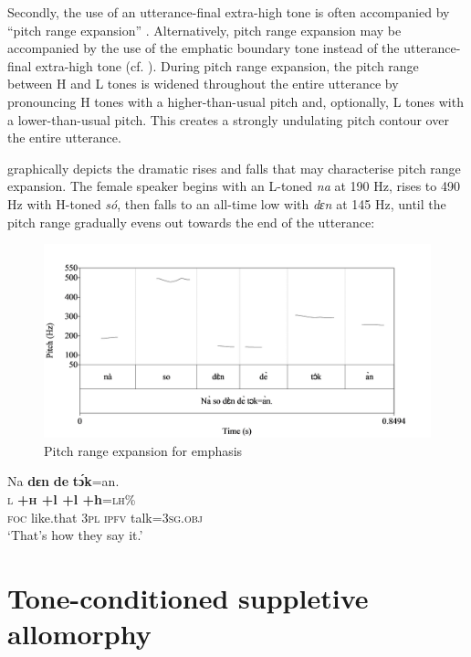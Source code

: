 Secondly, the use of an utterance-final extra-high tone is often accompanied by “pitch range expansion” \citep[276]{Yip2002}. Alternatively, pitch range expansion may be accompanied by the use of the emphatic boundary tone instead of the utterance-final extra-high tone (cf. ). During pitch range expansion, the pitch range between H and L tones is widened throughout the entire utterance by pronouncing H tones with a higher-than-usual pitch and, optionally, L tones with a lower-than-usual pitch. This creates a strongly undulating pitch contour over the entire utterance.

 graphically depicts the dramatic rises and falls that may characterise pitch range expansion. The female speaker begins with an L-toned \textit{na} at 190 Hz, rises to 490 Hz with H-toned \textit{só}, then falls to an all-time low with \textit{dɛn} at 145 Hz, until the pitch range gradually evens out towards the end of the utterance:

\begin{figure}
\caption{Pitch range expansion for emphasis}
\label{fig:key:3.26}
\includegraphics[height=.3\textheight]{figures/yakpomod-img28.png}
\end{figure}
 


\ea%
    \label{ex:key:65}
    \glll   Na      \textbf{dɛn}  \textbf{de}  \textbf{tɔ́k}=an.    \\
\textsc{l}  \textbf{\textsc{+h}    \textbf{+l}  \textbf{+l}  \textbf{+h}}\textsc{=lh\%}      \\
\textsc{foc}  like.that  \textsc{3pl}  \textsc{ipfv}  talk=\textsc{3sg.obj}\\
\glt ‘That’s how they say it.’
\z

\section{Tone-conditioned suppletive allomorphy}\label{sec:3.3}

